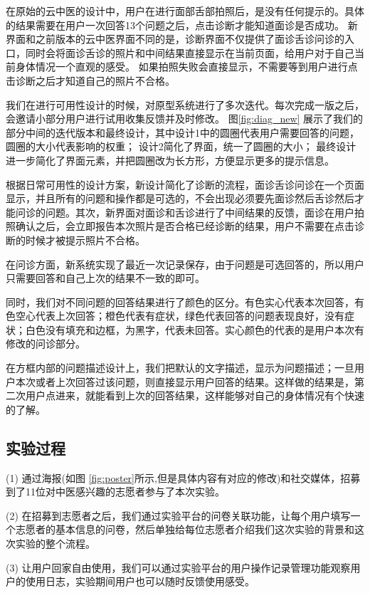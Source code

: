 在原始的云中医的设计中，用户在进行面部舌部拍照后，是没有任何提示的。具体的结果需要在用户一次回答13个问题之后，点击诊断才能知道面诊是否成功。
新界面和之前版本的云中医界面不同的是，诊断界面不仅提供了面诊舌诊问诊的入口，同时会将面诊舌诊的照片和中间结果直接显示在当前页面，给用户对于自己当前身体情况一个直观的感受。
如果拍照失败会直接显示，不需要等到用户进行点击诊断之后才知道自己的照片不合格。
    
我们在进行可用性设计的时候，对原型系统进行了多次迭代。每次完成一版之后，会邀请小部分用户进行试用收集反馈并及时修改。
图\ref{fig:diag_new} 展示了我们的部分中间的迭代版本和最终设计，其中设计1中的圆圈代表用户需要回答的问题，圆圈的大小代表影响的权重；
设计2简化了界面，统一了圆圈的大小；
最终设计进一步简化了界面元素，并把圆圈改为长方形，方便显示更多的提示信息。

根据日常可用性的设计方案，新设计简化了诊断的流程，面诊舌诊问诊在一个页面显示，并且所有的问题和操作都是可选的，不会出现必须要先面诊然后舌诊然后才能问诊的问题。其次，新界面对面诊和舌诊进行了中间结果的反馈，面诊在用户拍照确认之后，会立即报告本次照片是否合格已经诊断的结果，用户不需要在点击诊断的时候才被提示照片不合格。

在问诊方面，新系统实现了最近一次记录保存，由于问题是可选回答的，所以用户只需要回答和自己上次的结果不一致的即可。

同时，我们对不同问题的回答结果进行了颜色的区分。有色实心代表本次回答，有色空心代表上次回答；橙色代表有症状，绿色代表回答的问题表现良好，没有症状；白色没有填充和边框，为黑字，代表未回答。实心颜色的代表的是用户本次有修改的问诊部分。

在方框内部的问题描述设计上，我们把默认的文字描述，显示为问题描述；一旦用户本次或者上次回答过该问题，则直接显示用户回答的结果。这样做的结果是，第二次用户点进来，就能看到上次的回答结果，这样能够对自己的身体情况有个快速的了解。


\subsection{实验过程}


(1) 通过海报(如图 \ref{fig:poster}所示,但是具体内容有对应的修改)和社交媒体，招募到了11位对中医感兴趣的志愿者参与了本次实验。

(2) 在招募到志愿者之后，我们通过实验平台的问卷关联功能，让每个用户填写一个志愿者的基本信息的问卷，然后单独给每位志愿者介绍我们这次实验的背景和这次实验的整个流程。

(3) 让用户回家自由使用，我们可以通过实验平台的用户操作记录管理功能观察用户的使用日志，实验期间用户也可以随时反馈使用感受。

